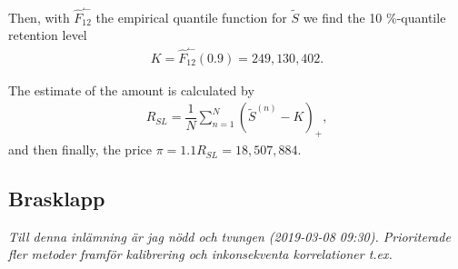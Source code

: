 \documentclass[11pt]{article}
\begin{document}
Then, with $\hat{F}_{12}^\leftharpoonup$ the empirical quantile function for $\tilde{S}$ we find the 10 \%-quantile retention level
\begin{align*} 
	K = \hat{F}_{12}^\leftharpoonup(0.9) = 249,130,402.
\end{align*}

The estimate of the amount  is calculated by
\begin{align} \label{eqsl1}
	R_{SL} = \dfrac{1}{N}\sum_{n=1}^N\left(	 \tilde{S}^{(n)}-K\right)_+ ,    
\end{align}
and then finally, the price $\pi = 1.1R_{SL} = 18,507,884$.

\subsection*{Brasklapp}
{\tiny
\it{Till denna inlämning är jag nödd och tvungen (2019-03-08 09:30). Prioriterade fler metoder framför kalibrering och inkonsekventa korrelationer t.ex.}
\par}
\end{document}
